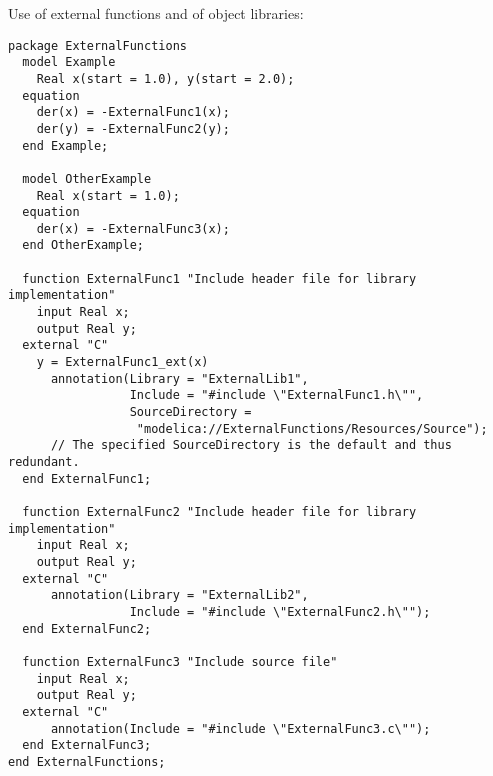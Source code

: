 \begin{example}
Use of external functions and of object libraries:
\begin{lstlisting}[language=modelica]
package ExternalFunctions
  model Example
    Real x(start = 1.0), y(start = 2.0);
  equation
    der(x) = -ExternalFunc1(x);
    der(y) = -ExternalFunc2(y);
  end Example;

  model OtherExample
    Real x(start = 1.0);
  equation
    der(x) = -ExternalFunc3(x);
  end OtherExample;

  function ExternalFunc1 "Include header file for library implementation"
    input Real x;
    output Real y;
  external "C"
    y = ExternalFunc1_ext(x)
      annotation(Library = "ExternalLib1",
                 Include = "#include \"ExternalFunc1.h\"",
                 SourceDirectory =
                  "modelica://ExternalFunctions/Resources/Source");
      // The specified SourceDirectory is the default and thus redundant.
  end ExternalFunc1;

  function ExternalFunc2 "Include header file for library implementation"
    input Real x;
    output Real y;
  external "C"
      annotation(Library = "ExternalLib2",
                 Include = "#include \"ExternalFunc2.h\"");
  end ExternalFunc2;

  function ExternalFunc3 "Include source file"
    input Real x;
    output Real y;
  external "C"
      annotation(Include = "#include \"ExternalFunc3.c\"");
  end ExternalFunc3;
end ExternalFunctions;


\end{lstlisting}
\end{example}
